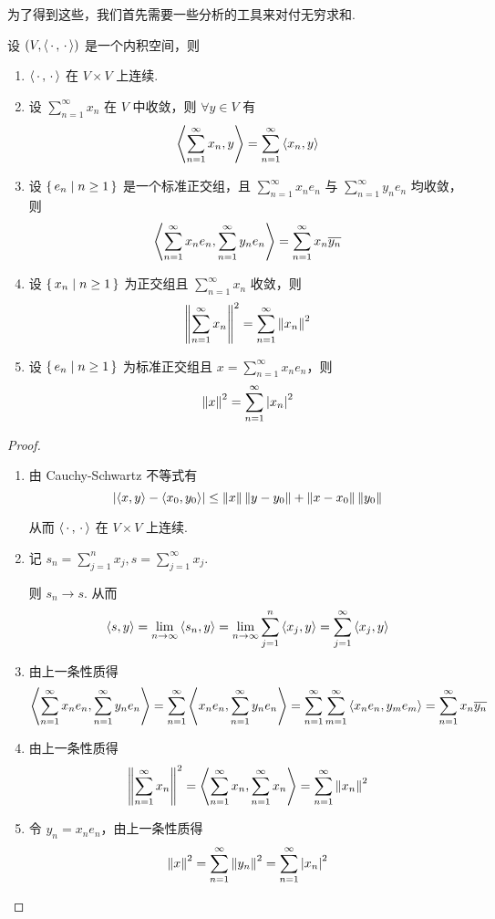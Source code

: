 为了得到这些，我们首先需要一些分析的工具来对付无穷求和.


\begin{property}
    设 $(V,\left\langle{\,\cdot\,,\,\cdot\,}\right\rangle)$ 是一个内积空间，则

    \begin{enumerate}
        \item $\left\langle{\,\cdot\,,\,\cdot\,}\right\rangle$ 在 $V\times V$ 上连续.
        
        \item 设 $\sum\limits_{n=1}^\infty x_n$ 在 $V$ 中收敛，则 $\forall y\in V$ 有
$$
\left\langle{\sum_{n=1}^\infty x_n,y}\right\rangle=\sum_{n=1}^\infty\left\langle{x_n,y}\right\rangle
$$

        \item 设 $\set{e_n|n\ge 1}$ 是一个标准正交组，且 $\sum\limits_{n=1}^\infty x_ne_n$ 与 $\sum\limits_{n=1}^\infty y_ne_n$ 均收敛，则
$$
\left\langle{\sum_{n=1}^\infty x_ne_n,\sum_{n=1}^\infty y_ne_n}\right\rangle=\sum_{n=1}^\infty x_n\overline{y_n}
$$

        \item 设 $\set{x_n|n\ge 1}$ 为正交组且 $\sum\limits_{n=1}^\infty x_n$ 收敛，则
$$
\left\lVert{\sum_{n=1}^\infty x_n}\right\rVert^2=\sum_{n=1}^\infty\left\lVert{x_n}\right\rVert^2
$$

        \item 设 $\set{e_n|n\ge 1}$ 为标准正交组且 $x=\sum\limits_{n=1}^\infty x_ne_n$，则
$$
\left\lVert{x}\right\rVert^2=\sum_{n=1}^\infty\left\lvert{x_n}\right\rvert^2
$$
    \end{enumerate}
\end{property}
\begin{proof}
    \begin{enumerate}
        \item 由 Cauchy-Schwartz 不等式有
$$
\left\lvert{\left\langle{x,y}\right\rangle-\left\langle{x_0,y_0}\right\rangle}\right\rvert\le\left\lVert{x}\right\rVert\left\lVert{y-y_0}\right\rVert+\left\lVert{x-x_0}\right\rVert\left\lVert{y_0}\right\rVert
$$

        从而 $\left\langle{\,\cdot\,,\,\cdot\,}\right\rangle$ 在 $V\times V$ 上连续.

        \item 记 $s_n=\sum\limits_{j=1}^nx_j,s=\sum\limits_{j=1}^\infty x_j$.
        
        则 $s_n\to s$. 从而
$$
\left\langle{s,y}\right\rangle=\lim_{n\to\infty}\left\langle{s_n,y}\right\rangle=\lim_{n\to\infty}\sum_{j=1}^n\left\langle{x_j,y}\right\rangle=\sum_{j=1}^\infty\left\langle{x_j,y}\right\rangle
$$

        \item 由上一条性质得
$$
\left\langle{\sum_{n=1}^\infty x_ne_n,\sum_{n=1}^\infty y_ne_n}\right\rangle=\sum_{n=1}^\infty\left\langle{x_ne_n,\sum_{n=1}^\infty y_ne_n}\right\rangle=\sum_{n=1}^\infty\sum_{m=1}^\infty\left\langle{x_ne_n,y_me_m}\right\rangle=\sum_{n=1}^\infty x_n\overline{y_n}
$$
        
        \item 由上一条性质得
$$
\left\lVert{\sum_{n=1}^\infty x_n}\right\rVert^2=\left\langle{\sum_{n=1}^\infty x_n,\sum_{n=1}^\infty x_n}\right\rangle=\sum_{n=1}^\infty\left\lVert{x_n}\right\rVert^2
$$

        \item 令 $y_n=x_ne_n$，由上一条性质得
$$
\left\lVert{x}\right\rVert^2=\sum_{n=1}^\infty\left\lVert{y_n}\right\rVert^2=\sum_{n=1}^\infty\left\lvert{x_n}\right\rvert^2
$$
    \end{enumerate}
\end{proof}

